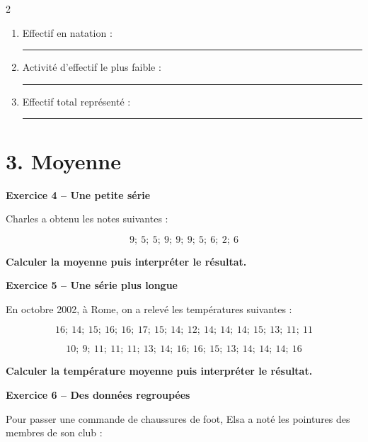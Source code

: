 \documentclass[11pt,a4paper,landscape]{article}
\newcommand{\soustitreexo}[1]{%
  {\sffamily\bfseries\color{TitreC}#1}\par
  \vspace{0.04em}
}
\newcommand{\reponse}[1][2.4cm]{%
  \rule{#1}{0.35pt}
}
\newcommand{\lignepointillee}{%
  \noindent\dotfill\par
  \vspace{0.18em}
}
\newcommand{\deuxlignes}{%
  \lignepointillee
  \lignepointillee
}
\begin{document}
\begin{multicols*}{2}
\begin{center}

\end{center}

\begin{enumerate}[label=\alph*)]

  \item Effectif en natation :
  \reponse[1.5cm]

  \item Activité d'effectif le plus faible :
  \reponse[2.4cm]

  \item Effectif total représenté :
  \reponse[1.5cm]

\end{enumerate}



\section*{3. Moyenne}

\soustitreexo{Exercice 4 -- Une petite série}

Charles a obtenu les notes suivantes :

\[
9;\ 5;\ 5;\ 9;\ 9;\ 9;\ 5;\ 6;\ 2;\ 6
\]

\textbf{Calculer la moyenne puis interpréter le résultat.}

\deuxlignes


\soustitreexo{Exercice 5 -- Une série plus longue}

En octobre 2002, à Rome, on a relevé les températures suivantes :

\[
16;\ 14;\ 15;\ 16;\ 16;\ 17;\ 15;\ 14;\ 12;\ 14;\ 14;\ 14;\
15;\ 13;\ 11;\ 11
\]

\[
10;\ 9;\ 11;\ 11;\ 11;\ 13;\ 14;\ 16;\ 16;\ 15;\ 13;\
14;\ 14;\ 14;\ 16
\]

\textbf{Calculer la température moyenne puis interpréter le résultat.}

\deuxlignes


\soustitreexo{Exercice 6 -- Des données regroupées}

Pour passer une commande de chaussures de foot,
Elsa a noté les pointures des membres de son club :


\end{multicols*}
\end{document}
